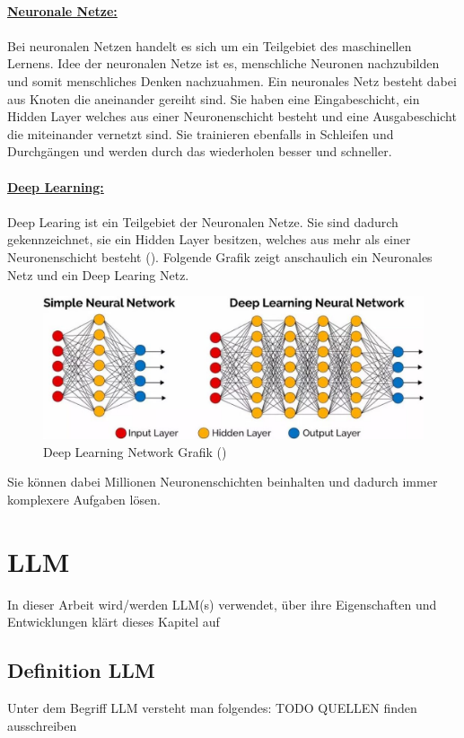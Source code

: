 \documentclass[12pt,toc=bib,toc=listof]{scrreprt}
\begin{document}
\\
\textbf{\underline{Neuronale Netze:}}\\
\\
Bei neuronalen Netzen handelt es sich um ein Teilgebiet des maschinellen Lernens. Idee der neuronalen Netze ist es, menschliche Neuronen nachzubilden und somit menschliches Denken nachzuahmen. Ein neuronales Netz besteht dabei aus Knoten die aneinander gereiht sind. Sie haben eine Eingabeschicht, ein Hidden Layer welches aus einer Neuronenschicht besteht und eine Ausgabeschicht die miteinander vernetzt sind. Sie trainieren ebenfalls in Schleifen und Durchgängen und werden durch das wiederholen besser und schneller.\\
\\
\textbf{\underline{Deep Learning:}}\\
\\
Deep Learing ist ein Teilgebiet der Neuronalen Netze. Sie sind dadurch gekennzeichnet, sie ein Hidden Layer besitzen, welches aus mehr als einer Neuronenschicht besteht (\cite{Dymatrix2018}). Folgende Grafik zeigt anschaulich ein Neuronales Netz und ein Deep Learing Netz.
\begin{figure} [H]
    \centering
    \includegraphics[width=0.75\linewidth]{./Bilder/Dymatrix_Deep_Learning_Networks.jpg}
    \caption{Deep Learning Network Grafik (\cite{Dymatrix2018})}
    \label{fig:enter-label}
\end{figure}
\noindent Sie können dabei Millionen Neuronenschichten beinhalten und dadurch immer komplexere Aufgaben lösen.
\newpage

\noindent\section{LLM} %
\label{sec:llm}
In dieser Arbeit wird/werden LLM(s) verwendet, über ihre Eigenschaften und Entwicklungen klärt dieses Kapitel auf

\subsection{Definition LLM} %
\label{sec:definitionLLM}
Unter dem Begriff LLM versteht man folgendes:
TODO QUELLEN finden ausschreiben
\end{document}
